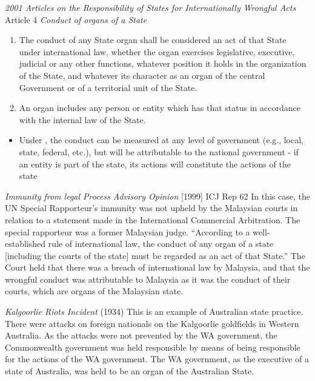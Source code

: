 \begin{conventiondetails}{\textit{2001 Articles on the Responsibility of States for Internationally Wrongful Acts} Article 4}
    \flushleft
    \textit{Conduct of organs of a State}

    \begin{enumerate}
        \item The conduct of any State organ shall be considered an act of that State under international law, whether the organ exercises legislative, executive, judicial or any other functions, whatever position it holds in the organization of the State, and whatever its character as an organ of the central Government or of a territorial unit of the State.
        \item An organ includes any person or entity which has that status in accordance with the internal law of the State.
    \end{enumerate}    
\end{conventiondetails}

\begin{itemize}
    \item Under , the conduct can be measured at any level of government (e.g., local, state, federal, etc.), but will be attributable to the national government - if an entity is part of the state, its actions will constitute the actions of the state
\end{itemize}

\begin{casedetails}{\textit{Immunity from legal Process Advisory Opinion} [1999] ICJ Rep 62}
    \flushleft
    In this case, the UN Special Rapporteur's immunity was not upheld by the Malaysian courts in relation to a statement made in the International Commercial Arbitration. The special rapporteur was a former Malaysian judge. ``According to a well-established rule of international law, the conduct of any organ of a state [including the courts of the state] must be regarded as an act of that State.'' The Court held that there was a breach of international law by Malaysia, and that the wrongful conduct was attributable to Malaysia as it was the conduct of their courts, which are organs of the Malaysian state.
\end{casedetails}

\begin{casedetails}{\textit{Kalgoorlie Riots Incident} (1934)}
    \flushleft
    This is an example of Australian state practice. There were attacks on foreign nationals on the Kalgoorlie goldfields in Western Australia. As the attacks were not prevented by the WA government, the Commonwealth government was held responsible by means of being responsible for the actions of the WA government. The WA government, as the executive of a state of Australia, was held to be an organ of the Australian State.
\end{casedetails}

